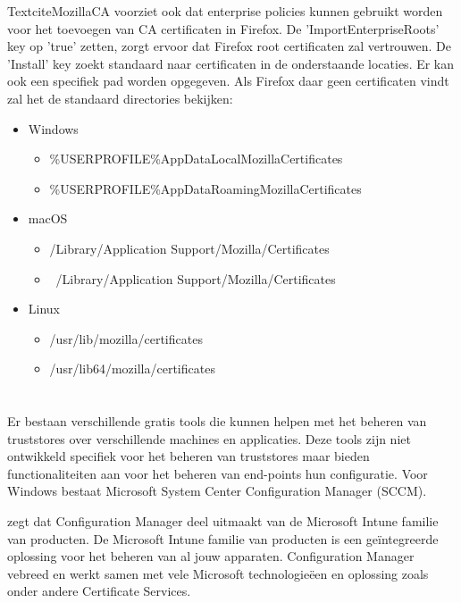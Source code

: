 Textcite{MozillaCA} voorziet ook dat enterprise policies kunnen gebruikt worden voor het toevoegen van CA certificaten in Firefox.
De 'ImportEnterpriseRoots' key op 'true' zetten, zorgt ervoor dat Firefox root certificaten zal vertrouwen.
De 'Install' key zoekt standaard naar certificaten in de onderstaande locaties. Er kan ook een specifiek pad worden opgegeven. Als Firefox daar geen certificaten vindt zal het de standaard directories bekijken:
\begin{itemize}
  \item Windows
  \begin{itemize}
    \item \%USERPROFILE\%AppDataLocalMozillaCertificates 
    \item \%USERPROFILE\%AppDataRoamingMozillaCertificates
  \end{itemize}

  \item macOS
  \begin{itemize}
    \item /Library/Application Support/Mozilla/Certificates 
    \item ~/Library/Application Support/Mozilla/Certificates 
  \end{itemize}

  \item Linux 
  \begin{itemize}
    \item /usr/lib/mozilla/certificates 
    \item /usr/lib64/mozilla/certificates 
  \end{itemize}
\end{itemize} \autocite{MozillaCA} \break

\section{}%
\label{sec:Bestaande tools}

Er bestaan verschillende gratis tools die kunnen helpen met het beheren van truststores over verschillende machines en applicaties.
Deze tools zijn niet ontwikkeld specifiek voor het beheren van truststores maar bieden functionaliteiten aan voor het beheren van end-points hun configuratie.
Voor Windows bestaat Microsoft System Center Configuration Manager (SCCM).

\textcite{ConfigMan} zegt dat Configuration Manager deel uitmaakt van de Microsoft Intune familie van producten. De Microsoft Intune familie van producten is een geïntegreerde oplossing voor het beheren van al jouw apparaten.
Configuration Manager vebreed en werkt samen met vele Microsoft technologieëen en oplossing zoals onder andere Certificate Services.

